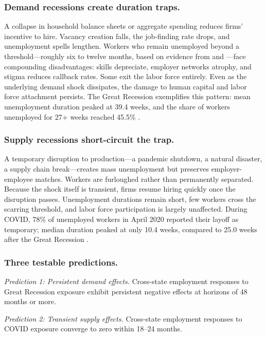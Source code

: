 \documentclass[12pt]{article}
\begin{document}
\subsubsection*{Demand recessions create duration traps.} A collapse in household balance sheets or aggregate spending reduces firms' incentive to hire. Vacancy creation falls, the job-finding rate drops, and unemployment spells lengthen. Workers who remain unemployed beyond a threshold---roughly six to twelve months, based on evidence from \citet{kroft2016long} and \citet{elsby2010labor}---face compounding disadvantages: skills depreciate, employer networks atrophy, and stigma reduces callback rates. Some exit the labor force entirely. Even as the underlying demand shock dissipates, the damage to human capital and labor force attachment persists. The Great Recession exemplifies this pattern: mean unemployment duration peaked at 39.4 weeks, and the share of workers unemployed for 27+ weeks reached 45.5\% \citep{kroft2016long}.

\subsubsection*{Supply recessions short-circuit the trap.} A temporary disruption to production---a pandemic shutdown, a natural disaster, a supply chain break---creates mass unemployment but preserves employer-employee matches. Workers are furloughed rather than permanently separated. Because the shock itself is transient, firms resume hiring quickly once the disruption passes. Unemployment durations remain short, few workers cross the scarring threshold, and labor force participation is largely unaffected. During COVID, 78\% of unemployed workers in April 2020 reported their layoff as temporary; median duration peaked at only 10.4 weeks, compared to 25.0 weeks after the Great Recession \citep{fujita2017recall}.

\subsubsection*{Three testable predictions.}

\textit{Prediction 1: Persistent demand effects.} Cross-state employment responses to Great Recession exposure exhibit persistent negative effects at horizons of 48 months or more.

\textit{Prediction 2: Transient supply effects.} Cross-state employment responses to COVID exposure converge to zero within 18--24 months.
\end{document}
